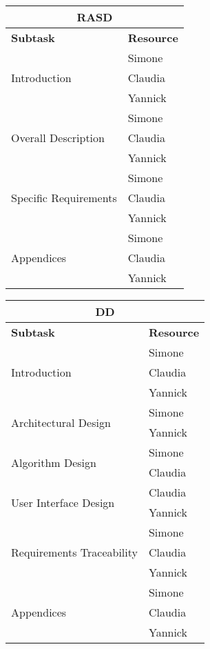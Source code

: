 \begin{center}
\begin{tabular}{ |l|l| }
	\multicolumn{2}{c}{\textbf{RASD}} \\ \hline
	\textbf{Subtask} & \textbf{Resource} \\ \hline
	\multirow{3}{*}{Introduction} & Simone \\
										& Claudia \\
										& Yannick \\ \hline
	\multirow{3}{*}{Overall Description} & Simone \\
										& Claudia \\
										& Yannick \\ \hline
	\multirow{3}{*}{Specific Requirements} & Simone \\
										& Claudia \\
										& Yannick \\ \hline
	\multirow{3}{*}{Appendices} & Simone \\ 
				& Claudia \\
				& Yannick \\ \hline

\end{tabular}
\end{center}

\vspace* {30px}


\begin{center}
\begin{tabular} {|l|l|}
	\multicolumn{2}{c}{\textbf{DD}} \\ \hline
	\textbf{Subtask} & \textbf{Resource} \\ \hline
	\multirow{3}{*}{Introduction} & Simone \\
								 & Claudia \\
								 & Yannick \\ \hline
	\multirow{2}{*}{Architectural Design} & Simone \\
										  &	Yannick \\ \hline
	\multirow{2}{*}{Algorithm Design} & Simone \\
									& Claudia \\ \hline
	\multirow{2}{*}{User Interface Design} & Claudia \\
				& Yannick \\ \hline
	\multirow{3}{*}{Requirements Traceability} & Simone \\
											   & Claudia \\
											   & Yannick \\ \hline
	\multirow{3}{*}{Appendices} & Simone \\ 
				& Claudia \\
				& Yannick \\ \hline
\end{tabular}
\end{center}

